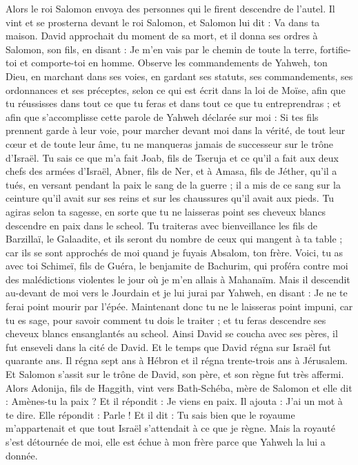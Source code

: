 \begin{multicols}{2}
Alors le roi Salomon envoya des personnes qui le firent descendre de l'autel. Il vint et se prosterna devant le roi Salomon, et Salomon lui dit : Va dans ta maison.
\VerseOne{}David approchait du moment de sa mort, et il donna ses ordres à Salomon, son fils, en disant :
Je m'en vais par le chemin de toute la terre, fortifie-toi et comporte-toi en homme.
Observe les commandements de Yahweh, ton Dieu, en marchant dans ses voies, en gardant ses statuts, ses commandements, ses ordonnances et ses préceptes, selon ce qui est écrit dans la loi de Moïse, afin que tu réussisses dans tout ce que tu feras et dans tout ce que tu entreprendras ;
et afin que s’accomplisse cette parole de Yahweh déclarée sur moi : Si tes fils prennent garde à leur voie, pour marcher devant moi dans la vérité, de tout leur cœur et de toute leur âme, tu ne manqueras jamais de successeur sur le trône d'Israël.
Tu sais ce que m'a fait Joab, fils de Tseruja et ce qu'il a fait aux deux chefs des armées d'Israël, Abner, fils de Ner, et à Amasa, fils de Jéther, qu'il a tués, en versant pendant la paix le sang de la guerre ; il a mis de ce sang sur la ceinture qu'il avait sur ses reins et sur les chaussures qu'il avait aux pieds.
Tu agiras selon ta sagesse, en sorte que tu ne laisseras point ses cheveux blancs descendre en paix dans le scheol.
Tu traiteras avec bienveillance les fils de Barzillaï, le Galaadite, et ils seront du nombre de ceux qui mangent à ta table ; car ils se sont approchés de moi quand je fuyais Absalom, ton frère.
Voici, tu as avec toi Schimeï, fils de Guéra, le benjamite de Bachurim, qui proféra contre moi des malédictions violentes le jour où je m'en allais à Mahanaïm. Mais il descendit au-devant de moi vers le Jourdain et je lui jurai par Yahweh, en disant : Je ne te ferai point mourir par l'épée.
Maintenant donc tu ne le laisseras point impuni, car tu es sage, pour savoir comment tu dois le traiter ; et tu feras descendre ses cheveux blancs ensanglantés au scheol.
Ainsi David se coucha avec ses pères, il fut enseveli dans la cité de David.
Et le temps que David régna sur Israël fut quarante ans. Il régna sept ans à Hébron et il régna trente-trois ans à Jérusalem.
Et Salomon s'assit sur le trône de David, son père, et son règne fut très affermi.
Alors Adonija, fils de Haggith, vint vers Bath-Schéba, mère de Salomon et elle dit : Amènes-tu la paix ? Et il répondit : Je viens en paix.
Il ajouta : J'ai un mot à te dire. Elle répondit : Parle !
Et il dit : Tu sais bien que le royaume m'appartenait et que tout Israël s'attendait à ce que je règne. Mais la royauté s’est détournée de moi, elle est échue à mon frère parce que Yahweh la lui a donnée.

\end{multicols}
